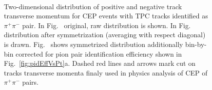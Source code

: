\begin{figure}[h]
{  \begin{subfigure}[b]{\linewidth}\addtocounter{subfigure}{-2}\vspace*{-10pt}
  \end{subfigure}\\
  \begin{minipage}[t][1.042\linewidth][t]{\linewidth}\vspace{10pt}
    \caption[Two-dimensional distribution of positive and negative track transverse momentum for CEP $\pi^{+}\pi^{-}$ events.]{Two-dimensional distribution of positive and negative track transverse momentum for CEP events with TPC tracks identified as $\pi^{+}\pi^{-}$ pair. In Fig.~ original, raw distribution is shown. In Fig.~ distribution after symmetrization (averaging with respect diagonal) is drawn. Fig.~ shows symmetrized distribution additionally bin-by-bin corrected for pion pair identification efficiency shown in Fig.~\ref{fig:pidEffVsPt}a. Dashed red lines and arrows mark cut on tracks transverse momenta finaly used in physics analysis of CEP of $\pi^{+}\pi^{-}$ pairs.}\label{fig:PtPlusVsPtMinus_pion}
  \end{minipage}
}%
\end{figure}


